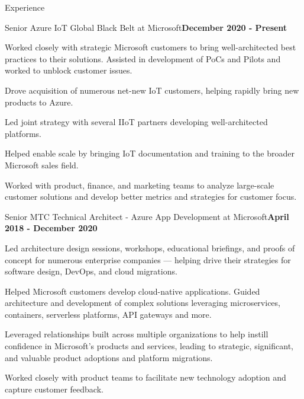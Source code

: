 \documentclass{resume} %
\begin{document}
\begin{rSection}{Experience}


\begin{rSubsection}{Senior Azure IoT Global Black Belt at Microsoft}{\bf December 2020 - Present}{}{}

\item Worked closely with strategic Microsoft customers to bring well-architected best practices to their solutions. Assisted in development of PoCs and Pilots and worked to unblock customer issues.  
\item Drove acquisition of numerous net-new IoT customers, helping  rapidly bring new products to Azure.
\item Led joint strategy with several IIoT partners developing well-architected platforms.
\item Helped enable scale by bringing IoT documentation and training to the broader Microsoft sales field.
\item Worked with product, finance, and marketing teams to analyze large-scale customer solutions and develop better metrics and strategies for customer focus.

\end{rSubsection}


\begin{rSubsection}{Senior MTC Technical Architect - Azure App Development at Microsoft}{\bf April 2018 - December 2020}{}{}

\item Led architecture design sessions, workshops, educational briefings, and proofs of concept for numerous enterprise companies --- helping drive their strategies for software design, DevOps, and cloud migrations.
\item Helped Microsoft customers develop cloud-native applications.  Guided architecture and development of complex solutions leveraging microservices, containers, serverless platforms, API gateways and more.
\item Leveraged relationships built across multiple organizations to help instill confidence in Microsoft's products and services, leading to strategic, significant, and valuable product adoptions and platform migrations.
\item Worked closely with product teams to facilitate new technology adoption and capture customer feedback.
    

\end{rSubsection}
\end{rSection}
\end{document}
